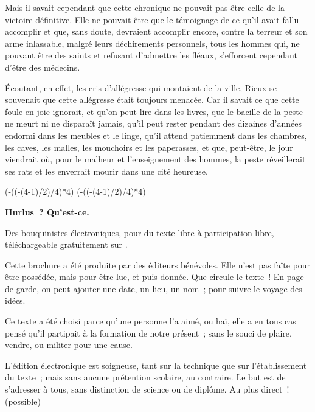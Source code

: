 \documentclass[french,twoside]{book} %
\newcommand\chapterclose{} %
\def\truncdiv#1#2{((#1-(#2-1)/2)/#2)}
\def\moduloop#1#2{(#1-\truncdiv{#1}{#2}*#2)}
\def\modulo#1#2{\number\numexpr\moduloop{#1}{#2}\relax}
\begin{document}
Mais il savait cependant que cette chronique ne pouvait pas être celle de la victoire définitive. Elle ne pouvait être que le témoignage de ce qu’il avait fallu accomplir et que, sans doute, devraient accomplir encore, contre la terreur et son arme inlassable, malgré leurs déchirements personnels, tous les hommes qui, ne pouvant être des saints et refusant d’admettre les fléaux, s’efforcent cependant d’être des médecins.\par
Écoutant, en effet, les cris d’allégresse qui montaient de la ville, Rieux se souvenait que cette allégresse était toujours menacée. Car il savait ce que cette foule en joie ignorait, et qu’on peut lire dans les livres, que le bacille de la peste ne meurt ni ne disparaît jamais, qu’il peut rester pendant des dizaines d’années endormi dans les meubles et le linge, qu’il attend patiemment dans les chambres, les caves, les malles, les mouchoirs et les paperasses, et que, peut-être, le jour viendrait où, pour le malheur et l’enseignement des hommes, la peste réveillerait ses rats et les enverrait mourir dans une cité heureuse.
\chapterclose

 


\ifbooklet
  \pagestyle{empty}
  \clearpage
  \ifnum\modulo{\value{page}}{4}=0 \hbox{}\newpage\hbox{}\newpage\fi
  \ifnum\modulo{\value{page}}{4}=1 \hbox{}\newpage\hbox{}\newpage\fi


  \hbox{}\newpage
  \ifodd\value{page}\hbox{}\newpage\fi
  {\centering\color{rubric}\bfseries\noindent\large
    Hurlus ? Qu’est-ce.\par
    \bigskip
  }
  \noindent Des bouquinistes électroniques, pour du texte libre à participation libre,
  téléchargeable gratuitement sur \href{https://hurlus.fr}{}.\par
  \bigskip
  \noindent Cette brochure a été produite par des éditeurs bénévoles.
  Elle n’est pas faîte pour être possédée, mais pour être lue, et puis donnée.
  Que circule le texte !
  En page de garde, on peut ajouter une date, un lieu, un nom ; pour suivre le voyage des idées.
  \par

  Ce texte a été choisi parce qu’une personne l’a aimé,
  ou haï, elle a en tous cas pensé qu’il partipait à la formation de notre présent ;
  sans le souci de plaire, vendre, ou militer pour une cause.
  \par

  L’édition électronique est soigneuse, tant sur la technique
  que sur l’établissement du texte ; mais sans aucune prétention scolaire, au contraire.
  Le but est de s’adresser à tous, sans distinction de science ou de diplôme.
  Au plus direct ! (possible)
  \par
\end{document}
